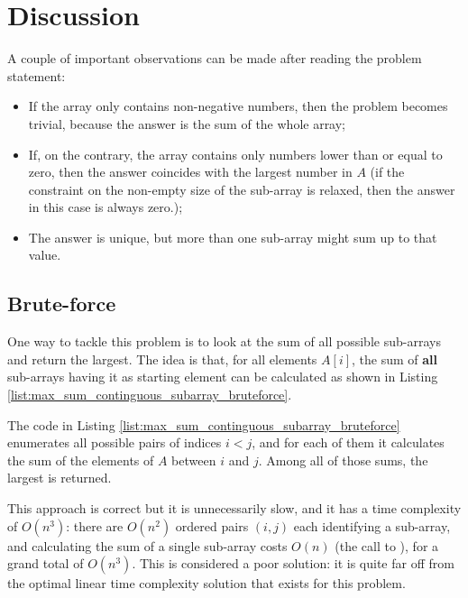 \section{Discussion}
\label{max_sum_continguous_subarray:sec:discussion}
A couple of important observations can be made after reading the problem statement:
\begin{itemize}
	\item If the array only contains non-negative numbers, then the problem becomes trivial, because the answer is the sum of the whole array;
	\item If, on the contrary, the array contains only  numbers lower than or equal to zero, then the answer coincides with the largest number in $A$ (if the constraint on the non-empty size of the sub-array is relaxed, then the answer in this case is always zero.);
	\item  The answer is unique, but more than one sub-array might sum up to that value.
\end{itemize}

\subsection{Brute-force}
\label{sec:max_sum_continguous_subarray_bruteforce}
One way to tackle this problem is to look at the sum of all possible sub-arrays and return the largest.
The idea is that, for all elements $A[i]$, the sum of \textbf{all} sub-arrays having it as starting element can be calculated as shown in Listing
\ref{list:max_sum_continguous_subarray_bruteforce}.




The code in Listing \ref{list:max_sum_continguous_subarray_bruteforce} enumerates all possible pairs of indices $i < j$, and for each of them it calculates the sum of the elements of $A$ between $i$ and $j$. Among all of those sums, the largest is returned. 

This approach is correct but it is unnecessarily slow, and it has a time complexity of $O(n^3)$: there are $O(n^2)$ ordered pairs $(i,j)$ each identifying a sub-array, and calculating the sum of a single sub-array costs $O(n)$ (the call to ), for a grand total of $O(n^3)$. 
This is considered a poor solution: it is quite far off from the optimal linear time complexity solution that exists for this problem.



